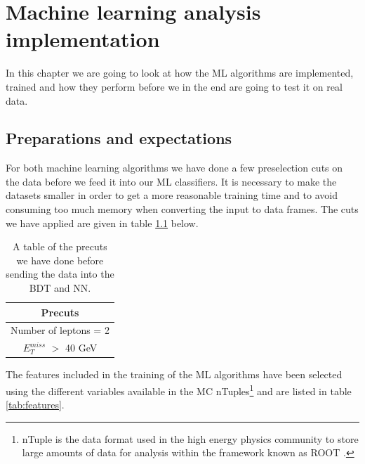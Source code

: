 \chapter{Machine learning analysis implementation}
\label{sec:MLanalysis}

In this chapter we are going to look at how the ML algorithms are implemented, trained and how they perform before we in the end are going to test it on real data.  

\section{Preparations and expectations}
For both machine learning algorithms we have done a few preselection cuts on the data before we feed it into our ML classifiers. It is necessary to make the datasets smaller in order to get a more reasonable training time and to avoid consuming too much memory when converting the input to data frames. The cuts we have applied are given in table \ref{tab:precutsSlepSlep} below.

\begin{table}[H]
    \centering
    \renewcommand{\arraystretch}{1.}
    \begin{tabular}{c}
    \toprule
    \textbf{Precuts}\\
    \midrule
    \midrule
        Number of leptons = 2 \\
        $E_T^{miss}$ $>$ 40 GeV\\
        \bottomrule
    \end{tabular}
    \caption{A table of the precuts we have done before sending the data into the BDT and NN.}
    \label{tab:precutsSlepSlep}
\end{table}

The features included in the training of the ML algorithms have been selected using the different variables available in the MC nTuples\footnote{nTuple is the data format used in the high energy physics community to store large amounts of data for analysis within the framework known as ROOT \cite{root}.} and are listed in table \ref{tab:features}.

